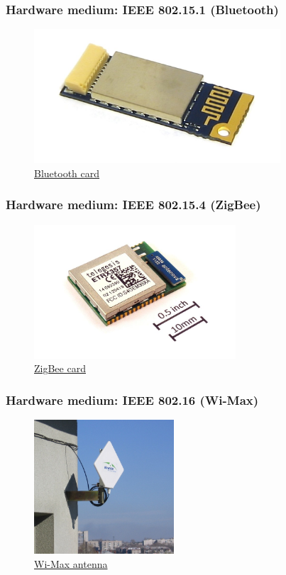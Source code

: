   \begin{frame}
    \frametitle{Hardware medium: IEEE 802.15.1 (Bluetooth)}
    \begin{figure}[t]
      \centering
      \includegraphics[height=5cm]{./imgs/bluetooth_card}
      \caption{\color{blue}\href{https://upload.wikimedia.org/wikipedia/commons/2/28/DELL_TrueMobile_350_Bluetooth_card.jpg}{Bluetooth card}}
      \label{fig:bluetooth_card}
    \end{figure}
  \end{frame}
  \begin{frame}
    \frametitle{Hardware medium: IEEE 802.15.4 (ZigBee)}
    \begin{figure}[t]
      \centering
      \includegraphics[height=5cm]{./imgs/zigbee.jpg}
      \caption{\color{blue}\href{https://upload.wikimedia.org/wikipedia/commons/thumb/2/29/ETRX357_ZigBee_module_with_size_ref.JPG/800px-ETRX357_ZigBee_module_with_size_ref.JPG}{ZigBee card}}
      \label{fig:ZigBee}
    \end{figure}
  \end{frame}
  \begin{frame}
    \frametitle{Hardware medium: IEEE 802.16 (Wi-Max)}
    \begin{figure}[t]
      \centering
      \includegraphics[height=5cm]{./imgs/Wi-Max.jpg}
      \caption{\color{blue}\href{https://upload.wikimedia.org/wikipedia/commons/d/db/Alvarion_CPE.jpg}{Wi-Max antenna}}
      \label{fig:Wi-Max_antenna}
    \end{figure}
  \end{frame}
